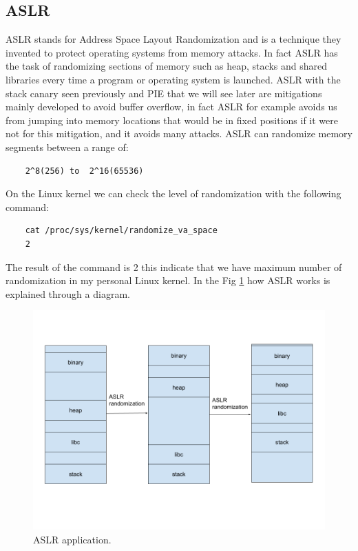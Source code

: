     \subsection{ASLR}
    ASLR stands for Address Space Layout Randomization and is a technique they invented to protect operating systems from memory attacks.\newline
    In fact ASLR has the task of randomizing sections of memory such as heap, stacks and shared libraries every time a program or operating system is launched.\newline
    ASLR with the stack canary seen previously and PIE that we will see later are mitigations mainly developed to avoid buffer overflow, in fact ASLR for example avoids us from jumping into memory locations that would be in fixed positions if it were not for this mitigation, and it avoids many attacks.\newline
    ASLR can randomize memory segments between a range of:
    \begin{verbatim} 
    2^8(256) to  2^16(65536)
    \end{verbatim}
    On the Linux kernel we can check the level of randomization with the following command:
    \begin{verbatim}
    cat /proc/sys/kernel/randomize_va_space
    2
    \end{verbatim}
    The result of the command is 2 this indicate that we have maximum number of randomization in my personal Linux kernel.\newline
    In the Fig \ref{fig:ASLR_scheme} how ASLR works is explained through a diagram.
     \begin{figure}
         \centering
         \includegraphics[width=0.8\linewidth]{Images/aslr_explanation.png}
         \caption{ASLR application.}
         \label{fig:ASLR_scheme}
    \end{figure}

